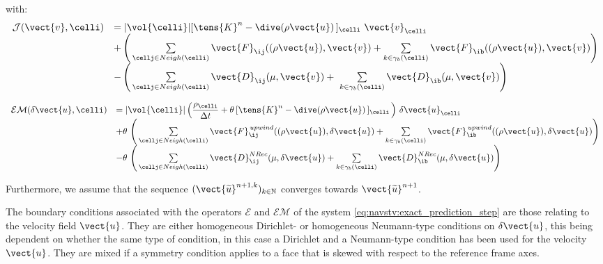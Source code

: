 with:
\begin{equation*}
\begin{array}{ll}
\mathcal{J}(\vect{v},\celli) & = |{\vol{\celli}}|  [\tens{K}^{n}-\dive(\rho \vect{u})\,]_{\celli}\,\,\vect{v}_{\celli} \\
& + \left(\,\sum\limits_{\cellj \in Neigh(\celli)}{\vect{F}_{\ij}((\rho\vect{u}),\vect{v})}
+ \sum\limits_{k\in {\gamma_b(\celli)}} {\vect{F}_{\ib}((\rho \vect{u}),\vect{v})}\right)\\
&-\left(\,\sum\limits_{\cellj\in Neigh(\celli)}{\vect{D}_{\ij}(\mu,\vect{v})}
+\,\,\sum\limits_{k\in {\gamma_b(\celli)}} {\vect{D}_{\ib}(\mu,\vect{v})}\right)\\
\end{array}
\end{equation*}

\begin{equation*}
\begin{array}{ll}
\mathcal{EM}(\delta\vect{u}, \celli) & =
|{\vol{\celli}}| \left( \displaystyle\frac{\rho_\celli}{\Delta t} +\theta\,[\tens{K}^{n}-\dive(\rho \vect{u})\,]_{\celli}\,\right)\,\delta\vect{u}_{\celli}\\
&+\theta\,\left(\,\sum\limits_{\cellj \in Neigh(\celli)}{\vect{F}^{\,upwind}_{\ij}((\rho\vect{u}),\delta\vect{u})}
+ \sum\limits_{k\in {\gamma_b(\celli)}} {\vect{F}^{\,upwind}_{\ib}((\rho \vect{u}),\delta\vect{u})}\right)\\
&-\theta\,\left(\,\sum\limits_{\cellj \in Neigh(\celli)}{\vect{D}^{NRec}_{\ij}(\mu,\delta\vect{u})}
+ \sum\limits_{k\in {\gamma_b(\celli)}} {\vect{D}^{NRec}_{\ib}(\mu,\delta\vect{u})}\right)\\
\end{array}
\end{equation*}


Furthermore, we assume that the sequence  $(\vect{\widetilde{u}}^{n+1,k})_{k\in \mathbb{N}}$
converges %
towards $\vect{\widetilde{u}}^{n+1}$.\\

\begin{remark}
The boundary conditions associated with the operators $\mathcal{E}$ and
$\mathcal{EM}$ of the system \eqref{eq:navstv:exact_prediction_step} are those relating to the velocity field $\vect{u}$. They are either homogeneous Dirichlet- or homogeneous Neumann-type conditions on $\delta\vect{u}$, this being dependent on whether the same type of condition, in this case a Dirichlet and a Neumann-type condition has been used for the velocity $\vect{u}$. They are mixed if a symmetry condition applies to a face that is skewed with respect to the reference frame axes.
\end{remark}


